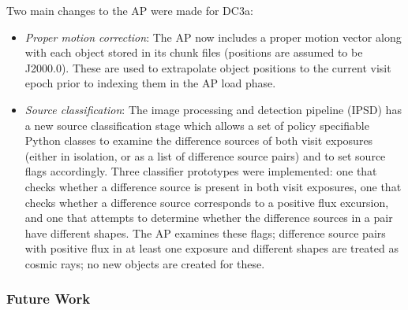 Two main changes to the AP were made for DC3a:
\begin{itemize}
\item \emph{Proper motion correction}:
    The AP now includes a proper motion vector along with each object stored
    in its chunk files (positions are assumed to be J2000.0). These are used
    to extrapolate object positions to the current visit epoch prior to
    indexing them in the AP load phase.
\item \emph{Source classification}:
    The image processing and detection pipeline (IPSD) has a new source
    classification stage which allows a set of policy specifiable Python
    classes to examine the difference sources of both visit exposures
    (either in isolation, or as a list of difference source pairs) and to set
    source flags accordingly. Three classifier prototypes were implemented:
    one that checks whether a difference source is present in both visit
    exposures, one that checks whether a difference source corresponds to a
    positive flux excursion, and one that attempts to determine whether the
    difference sources in a pair have different shapes. The AP examines these
    flags; difference source pairs with positive flux in at least one exposure
    and different shapes are treated as cosmic rays; no new objects are
    created for these.
\end{itemize}

\subsubsection{Future Work}

